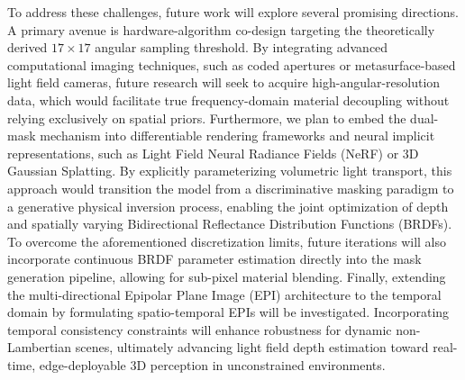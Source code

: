 To address these challenges, future work will explore several promising directions. A primary avenue is hardware-algorithm co-design targeting the theoretically derived $17 \times 17$ angular sampling threshold. By integrating advanced computational imaging techniques, such as coded apertures or metasurface-based light field cameras, future research will seek to acquire high-angular-resolution data, which would facilitate true frequency-domain material decoupling without relying exclusively on spatial priors. Furthermore, we plan to embed the dual-mask mechanism into differentiable rendering frameworks and neural implicit representations, such as Light Field Neural Radiance Fields (NeRF) or 3D Gaussian Splatting. By explicitly parameterizing volumetric light transport, this approach would transition the model from a discriminative masking paradigm to a generative physical inversion process, enabling the joint optimization of depth and spatially varying Bidirectional Reflectance Distribution Functions (BRDFs). To overcome the aforementioned discretization limits, future iterations will also incorporate continuous BRDF parameter estimation directly into the mask generation pipeline, allowing for sub-pixel material blending. Finally, extending the multi-directional Epipolar Plane Image (EPI) architecture to the temporal domain by formulating spatio-temporal EPIs will be investigated. Incorporating temporal consistency constraints will enhance robustness for dynamic non-Lambertian scenes, ultimately advancing light field depth estimation toward real-time, edge-deployable 3D perception in unconstrained environments.